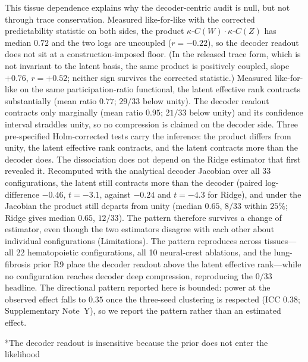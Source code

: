 \documentclass[11pt,a4paper]{article}
\makeatletter
\renewcommand{\subsection}{\@startsection{subsection}{2}{0pt}{10pt plus 4pt}{4pt}{\normalsize\bfseries}}
\makeatother
\begin{document}
This tissue dependence explains why the decoder-centric audit is null, but not through
trace conservation. Measured like-for-like with the corrected predictability statistic on both
sides, the product $\kappa$-$C(W)\cdot\kappa$-$C(Z)$ has median $0.72$ and the two logs are
uncoupled ($r=-0.22$), so the decoder readout does not sit at a construction-imposed floor. (In
the released trace form, which is not invariant to the latent basis, the same product is positively coupled, slope $+0.76$, $r=+0.52$; neither sign survives the corrected statistic.) Measured like-for-like on the same participation-ratio functional, the latent effective rank contracts substantially (mean ratio $0.77$; $29/33$ below unity). The decoder readout contracts only marginally (mean ratio $0.95$; $21/33$ below unity) and its confidence interval straddles unity, so no compression is claimed on the decoder side. Three
pre-specified Holm-corrected tests carry the inference: the product differs from unity,
the latent effective rank contracts, and the latent contracts more than the decoder does.
The dissociation does not depend on the Ridge estimator that first revealed it. Recomputed with
the analytical decoder Jacobian over all 33 configurations, the latent still contracts more than
the decoder (paired log-difference $-0.46$, $t=-3.1$, against $-0.24$ and $t=-4.3$ for Ridge), and
under the Jacobian the product still departs from unity (median $0.65$, $8/33$ within $25\%$;
Ridge gives median $0.65$, $12/33$). The pattern therefore
survives a change of estimator, even though the two estimators disagree with each other about
individual configurations (Limitations).
The pattern reproduces across tissues---all 22 hematopoietic configurations, all 10
neural-crest ablations, and the lung-fibrosis prior R9 place the decoder readout above the
latent effective rank---while no configuration reaches decoder deep compression,
reproducing the $0/33$ headline. The directional pattern reported here is bounded: power at the observed effect falls to $0.35$ once the three-seed clustering is respected (ICC $0.38$; Supplementary Note~Y), so we report the pattern rather than an estimated effect.

\subsection*{The decoder readout is insensitive because the prior does not enter the likelihood}
\end{document}
